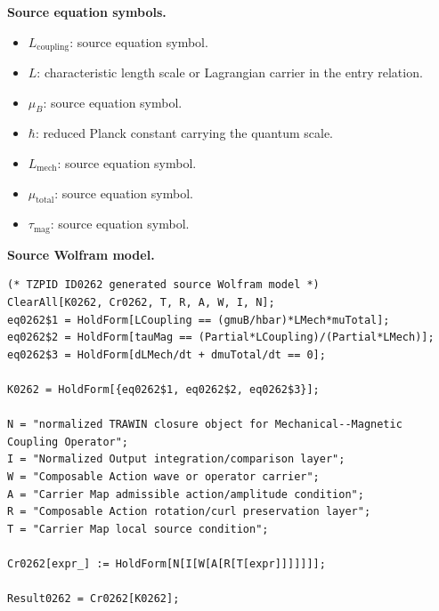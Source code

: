 \begin{minipage}[t]{0.49\linewidth}
\begingroup
\small
\raggedright
\textbf{Source equation symbols.}\par
\begin{itemize}[leftmargin=1.35em,itemsep=1pt,topsep=1pt,parsep=0pt]
    \item $L_{\mathrm{coupling}}$: source equation symbol.
    \item $L$: characteristic length scale or Lagrangian carrier in the entry relation.
    \item $\mu_B$: source equation symbol.
    \item $\hbar$: reduced Planck constant carrying the quantum scale.
    \item $L_{\mathrm{mech}}$: source equation symbol.
    \item $\mu_{\mathrm{total}}$: source equation symbol.
    \item $\tau_{\mathrm{mag}}$: source equation symbol.
\end{itemize}
\endgroup
\end{minipage}\hfill
\begin{minipage}[t]{0.47\linewidth}
\begingroup
\scriptsize
\raggedright
\textbf{Source Wolfram model.}\par
\begin{Verbatim}[fontsize=\tiny,breaklines=true,breakanywhere=true]
(* TZPID ID0262 generated source Wolfram model *)
ClearAll[K0262, Cr0262, T, R, A, W, I, N];
eq0262$1 = HoldForm[LCoupling == (gmuB/hbar)*LMech*muTotal];
eq0262$2 = HoldForm[tauMag == (Partial*LCoupling)/(Partial*LMech)];
eq0262$3 = HoldForm[dLMech/dt + dmuTotal/dt == 0];

K0262 = HoldForm[{eq0262$1, eq0262$2, eq0262$3}];

N = "normalized TRAWIN closure object for Mechanical--Magnetic Coupling Operator";
I = "Normalized Output integration/comparison layer";
W = "Composable Action wave or operator carrier";
A = "Carrier Map admissible action/amplitude condition";
R = "Composable Action rotation/curl preservation layer";
T = "Carrier Map local source condition";

Cr0262[expr_] := HoldForm[N[I[W[A[R[T[expr]]]]]]];

Result0262 = Cr0262[K0262];
\end{Verbatim}
\endgroup
\end{minipage}

